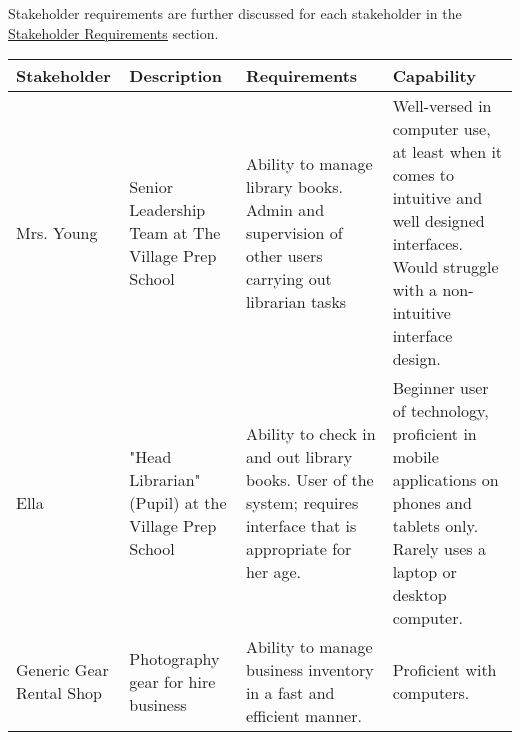 \documentclass[../../../main.tex]{subfiles}
\begin{document}
Stakeholder requirements are further discussed for each stakeholder in the \underline{\hyperref[sec:stakeholderRequirements]{Stakeholder Requirements}} section.\\

\newcommand{\stakeholderEntry}[4]{{#1} & {#2} & {#3} & {#4}\\\hline}

\begin{tabular}{ | >{\raggedright}p{} | >{\raggedright}p{} | >{\raggedright}p{} | >{\raggedright\arraybackslash}p{} | }
    \hline
    \textbf{Stakeholder} & \textbf{Description} & \textbf{Requirements} & \textbf{Capability} \\
    \hline

    \stakeholderEntry
    {Mrs. Young}
    {Senior Leadership Team at The Village Prep School}
    {Ability to manage library books. Admin and supervision of other users carrying out librarian tasks}
    {Well-versed in computer use, at least when it comes to intuitive and well designed interfaces. Would struggle with a non-intuitive interface design.}

    \stakeholderEntry
    {Ella}
    {"Head Librarian" (Pupil) at the Village Prep School}
    {Ability to check in and out library books. User of the system; requires interface that is appropriate for her age.}
    {Beginner user of technology, proficient in mobile applications on phones and tablets only. Rarely uses a laptop or desktop computer.}

    \stakeholderEntry
    {Generic Gear \newline Rental Shop}
    {Photography gear for hire business}
    {Ability to manage business inventory in a fast and efficient manner.}
    {Proficient with computers.}
    \hline
\end{tabular}
\end{document}

